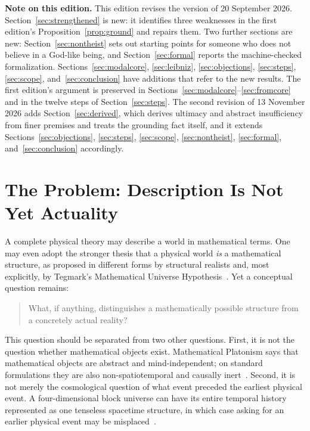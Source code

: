 \documentclass[11pt,letterpaper]{article}
\theoremstyle{plain}
\theoremstyle{definition}
\begin{document}
\begin{center}
\begin{minipage}{0.9\linewidth}
\small\textbf{Note on this edition.} This edition revises the version of 20 September 2026. Section~\ref{sec:strengthened} is new: it identifies three weaknesses in the first edition's Proposition~\ref{prop:ground} and repairs them. Two further sections are new: Section~\ref{sec:nontheist} sets out starting points for someone who does not believe in a God-like being, and Section~\ref{sec:formal} reports the machine-checked formalization. Sections~\ref{sec:modalcore}, \ref{sec:leibniz}, \ref{sec:objections}, \ref{sec:steps}, \ref{sec:scope}, and~\ref{sec:conclusion} have additions that refer to the new results. The first edition's argument is preserved in Sections~\ref{sec:modalcore}--\ref{sec:fromcore} and in the twelve steps of Section~\ref{sec:steps}. The second revision of 13 November 2026 adds Section~\ref{sec:derived}, which derives ultimacy and abstract insufficiency from finer premises and treats the grounding fact itself, and it extends Sections~\ref{sec:objections}, \ref{sec:steps}, \ref{sec:scope}, \ref{sec:nontheist}, \ref{sec:formal}, and~\ref{sec:conclusion} accordingly.
\end{minipage}
\end{center}

\clearpage
{\small\tableofcontents}

\clearpage

\section{The Problem: Description Is Not Yet Actuality}

A complete physical theory may describe a world in mathematical terms. One may even adopt the stronger thesis that a physical world \emph{is} a mathematical structure, as proposed in different forms by structural realists and, most explicitly, by Tegmark's Mathematical Universe Hypothesis~\cite{tegmark}. Yet a conceptual question remains:
\begin{quote}
What, if anything, distinguishes a mathematically possible structure from a concretely actual reality?
\end{quote}

This question should be separated from two other questions. First, it is not the question whether mathematical objects exist. Mathematical Platonism says that mathematical objects are abstract and mind-independent; on standard formulations they are also non-spatiotemporal and causally inert~\cite{linnebo,balaguer}. Second, it is not merely the cosmological question of what event preceded the earliest physical event. A four-dimensional block universe can have its entire temporal history represented as one tenseless spacetime structure, in which case asking for an earlier physical event may be misplaced~\cite{deng}.
\end{document}
